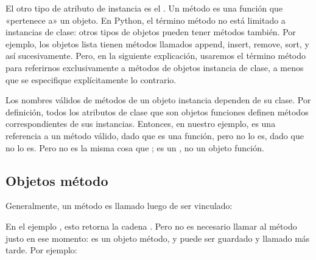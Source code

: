 \documentclass[a4,10pt,spanish]{sphinxmanual}
\begin{document}
\sphinxAtStartPar
El otro tipo de atributo de instancia es el .  Un método es una función que «pertenece a» un objeto.  En Python, el término método no está limitado a instancias de clase: otros tipos de objetos pueden tener métodos también.  Por ejemplo, los objetos lista tienen métodos llamados append, insert, remove, sort, y así sucesivamente.  Pero, en la siguiente explicación, usaremos el término método para referirnos exclusivamente a métodos de objetos instancia de clase, a menos que se especifique explícitamente lo contrario.

\ignorespaces 
\sphinxAtStartPar
Los nombres válidos de métodos de un objeto instancia dependen de su clase. Por definición, todos los atributos de clase que son objetos funciones definen métodos correspondientes de sus instancias.  Entonces, en nuestro ejemplo,  es una referencia a un método válido, dado que  es una función, pero  no lo es, dado que  no lo es.  Pero  no es la misma cosa que ; es un , no un objeto función.


\subsection{Objetos método}
\label{\detokenize{tutorial/classes:method-objects}}\label{\detokenize{tutorial/classes:tut-methodobjects}}
\sphinxAtStartPar
Generalmente, un método es llamado luego de ser vinculado:

\begin{sphinxVerbatim}[commandchars=\\\{\}]
\end{sphinxVerbatim}

\sphinxAtStartPar
En el ejemplo , esto retorna la cadena . Pero no es necesario llamar al método justo en ese momento:  es un objeto método, y puede ser guardado y llamado más tarde.  Por ejemplo:

\begin{sphinxVerbatim}[commandchars=\\\{\}]
  
 
\end{sphinxVerbatim}
\end{document}
